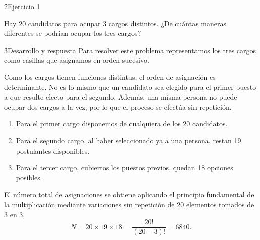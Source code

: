 \documentclass[main.tex]{subfiles}%
\begin{document}
\h2{Ejercicio 1}

Hay 20 candidatos para ocupar 3 cargos distintos. ¿De cuántas maneras diferentes se podrían ocupar los tres cargos?

\h3{Desarrollo y respuesta}
Para resolver este problema representamos los tres cargos como casillas que asignamos en orden sucesivo.

Como los cargos tienen funciones distintas, el orden de asignación es determinante. No es lo mismo que un candidato sea elegido para el primer puesto a que resulte electo para el segundo. Además, una misma persona no puede ocupar dos cargos a la vez, por lo que el proceso se efectúa sin repetición.

\begin{enumerate}
    \item Para el primer cargo disponemos de cualquiera de los 20 candidatos.
    \item Para el segundo cargo, al haber seleccionado ya a una persona, restan 19 postulantes disponibles.
    \item Para el tercer cargo, cubiertos los puestos previos, quedan 18 opciones posibles.
\end{enumerate}

El número total de asignaciones se obtiene aplicando el principio fundamental de la multiplicación mediante variaciones sin repetición de 20 elementos tomados de 3 en 3,
\begin{equation*}
    N = 20 \times 19 \times 18 = \frac{20!}{(20 - 3)!} = 6840.
\end{equation*}

\end{document}
